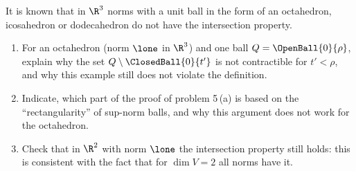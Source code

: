 \documentclass[a4paper,12pt]{report}
\begin{document}
\begin{task}
It is known that in $\R^3$ norms with a unit ball in the form of an octahedron, icosahedron or dodecahedron do not have the intersection property.

\begin{enumerate}[label=\textup{(\alph*)}]
\item For an octahedron \textup{(}norm $\lone$ in $\R^3$\textup{)} and one ball $Q = \OpenBall{0}{\rho}$, explain why the set $Q \setminus \ClosedBall{0}{t'}$ is not contractible for $t' < \rho$, and why this example still does not violate the definition.
\item Indicate\textup{,} which part of the proof of problem \textup{5}\,\textup{(a)} is based on the ``rectangularity'' of sup-norm balls, and why this argument does not work for the octahedron.
\item Check that in $\R^2$ with norm $\lone$ the intersection property still holds\textup{:} this is consistent with the fact that for $\dim V = 2$ all norms have it.
\end{enumerate}
\end{task}
\end{document}
